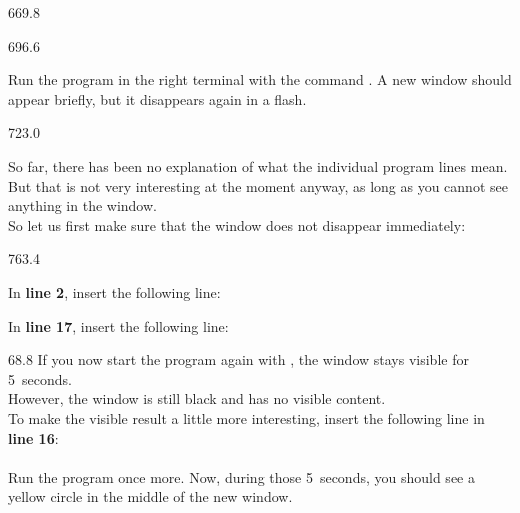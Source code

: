 \documentclass{aslab}
\begin{document}
\begin{region}{669.8}
\end{region}

\begin{region}[pitch=13.2]{696.6}
\begin{tasks}
\item Run the program in the right terminal with the command
  . A new window should appear briefly, but it
  disappears again in a flash.
\end{tasks}
\end{region}

\begin{region}[pitch=13.2]{723.0}
\begin{tasks}[start=2]
\item So far, there has been no explanation of what the individual program
  lines mean. But that is not very interesting at the moment anyway, as
  long as you cannot see anything in the window.\\
  So let us first make sure that the window does not disappear immediately:
\end{tasks}
\end{region}

\begin{region}[x=74.7,right=0,pitch=14.3]{763.4}
\begin{tasks}[label={\bfseries\arabic*.}]
\item In \textbf{line 2}, insert the following line: 
\item In \textbf{line 17}, insert the following line: 
\end{tasks}
\end{region}

\nextpage
\begin{region}[x=74.7,right=0,pitch=13.4]{68.8}
If you now start the program again with , the
window stays visible for 5~seconds.\\
However, the window is still black and has no visible content.\\
To make the visible result a little more interesting, insert the following
line in \textbf{line 16}:\\
\\
Run the program once more. Now, during those 5~seconds, you should see a
yellow circle in the middle of the new window.
\end{region}
\end{document}

